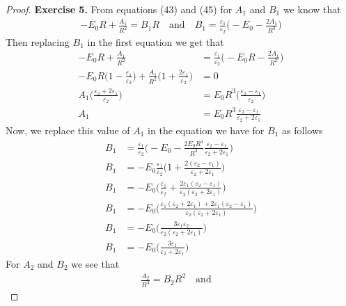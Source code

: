 \documentclass[11pt]{article}
\theoremstyle{definition}
\begin{document}
\cleardoublepage
\begin{proof}{\textbf{Exercise 5.}}
From equations (43) and (45) for $A_1$ and $B_1$ we know that
\begin{align*}
    -E_0R + \frac{A_1}{R^2} = B_1 R
    \quad\text{and}\quad
    B_1 = \frac{\varepsilon_1}{\varepsilon_2}\bigg(-E_0 - \frac{2A_1}{R^3}\bigg)
\end{align*}
Then replacing $B_1$ in the first equation we get that
\begin{align*}
    -E_0R + \frac{A_1}{R^2}
    &= \frac{\varepsilon_1}{\varepsilon_2}\bigg(-E_0R - \frac{2A_1}{R^2}\bigg)\\
    -E_0R\bigg(1 - \frac{\varepsilon_1}{\varepsilon_2}\bigg)
    + \frac{A_1}{R^2}\bigg(1 + \frac{2\varepsilon_1}{\varepsilon_2}\bigg)
    &= 0\\
    A_1\bigg(\frac{\varepsilon_2 + 2\varepsilon_1}{\varepsilon_2}\bigg)
    &= E_0R^3\bigg(\frac{\varepsilon_2 - \varepsilon_1}{\varepsilon_2}\bigg)\\
    A_1
    &= E_0R^3\frac{\varepsilon_2 - \varepsilon_1}{\varepsilon_2 + 2\varepsilon_1}
\end{align*}
Now, we replace this value of $A_1$ in the equation we have for $B_1$ as follows
\begin{align*}
    B_1 &= \frac{\varepsilon_1}{\varepsilon_2}
    \bigg(-E_0 - \frac{2E_0R^3}{R^3}
    \frac{\varepsilon_2 - \varepsilon_1}{\varepsilon_2 + 2\varepsilon_1}\bigg)\\
    B_1 &= -E_0\frac{\varepsilon_1}{\varepsilon_2}
    \bigg(1 +
    \frac{2(\varepsilon_2 - \varepsilon_1)}{\varepsilon_2 + 2\varepsilon_1}\bigg)\\
    B_1 &= -E_0
    \bigg(\frac{\varepsilon_1}{\varepsilon_2} + 
    \frac{2\varepsilon_1(\varepsilon_2 - \varepsilon_1)}
    {\varepsilon_2(\varepsilon_2 + 2\varepsilon_1)}\bigg)\\
    B_1 &= -E_0
    \bigg(
    \frac{\varepsilon_1(\varepsilon_2 + 2\varepsilon_1)
    + 2\varepsilon_1(\varepsilon_2 - \varepsilon_1)}
    {\varepsilon_2(\varepsilon_2 + 2\varepsilon_1)}\bigg)\\
    B_1 &= -E_0
    \bigg(\frac{3\varepsilon_1\varepsilon_2}
    {\varepsilon_2(\varepsilon_2 + 2\varepsilon_1)}\bigg)\\
    B_1 &= -E_0
    \bigg(\frac{3\varepsilon_1}{\varepsilon_2 + 2\varepsilon_1}\bigg)
\end{align*}
For $A_2$ and $B_2$ we see that
\begin{align*}
    \frac{A_2}{R^3} = B_2 R^2
    \quad\text{and}\quad

\end{align*}
\end{proof}
\end{document}
